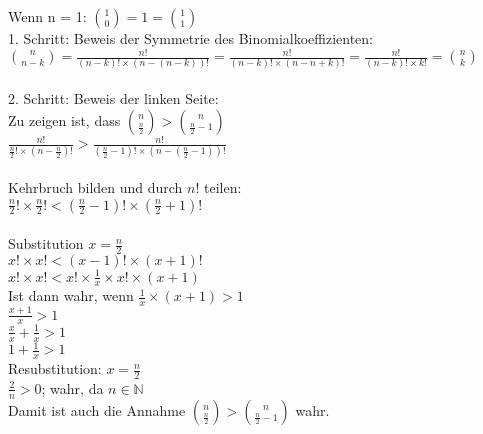\documentclass{disloloesung}
\begin{document}
\begin{sheet}{1}
    \begin{aufgabe}{1.4}{}
	Wenn n = 1: 
	$\binom{1}{0} = 1 = \binom{1}{1}$ \checkmark \\
	1. Schritt: Beweis der Symmetrie des Binomialkoeffizienten: \\
	$\binom{n}{n-k} = \frac{n!}{(n-k)!\times (n-(n-k))!} = \frac{n!}{(n-k)!\times (n-n+k)!} = \frac{n!}{(n-k)!\times k!} = \binom{n}{k}$ \checkmark \\\\
	2. Schritt: Beweis der linken Seite: \\
	Zu zeigen ist, dass $\binom{n}{\frac{n}{2}} > \binom{n}{\frac{n}{2}-1}$ \\
	$\frac{n!}{\frac{n}{2}!\times (n-\frac{n}{2})!} > \frac{n!}{(\frac{n}{2}-1)!\times (n-(\frac{n}{2}-1))!} $ \\\\
	Kehrbruch bilden und durch $n!$ teilen: \\  
	$\frac{n}{2}!\times \frac{n}{2}! < (\frac{n}{2}-1)!\times (\frac{n}{2}+1)! $ \\\\
	Substitution $x=\frac{n}{2}$ \\ 
	$x!\times x! < (x-1)!\times (x+1)! $ \\
	$x!\times x! < x!\times \frac{1}{x}\times x!\times (x+1) $ \\
	Ist dann wahr, wenn $\frac{1}{x}\times (x+1) > 1$ \\ 
	$\frac{x+1}{x} > 1$ \\ 
	$\frac{x}{x}+\frac{1}{x} > 1$ \\ 
	$1+\frac{1}{x} > 1$ \\ 
	Resubstitution: $x=\frac{n}{2}$ \\
	$\frac{2}{n} > 0$; wahr, da $ n \in \mathbb{N}$\\ 
	Damit ist auch die Annahme $\binom{n}{\frac{n}{2}} > \binom{n}{\frac{n}{2}-1}$ wahr. 

    \end{aufgabe}

\end{sheet}
\end{document}
